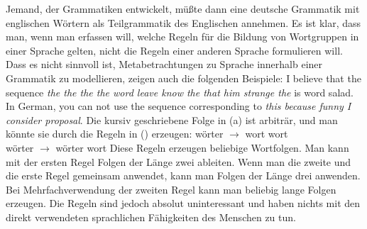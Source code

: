 Jemand, der Grammatiken entwickelt, müßte dann eine deutsche Grammatik mit englischen Wörtern
als Teilgrammatik des Englischen annehmen. Es ist klar, dass man, wenn man erfassen will, welche
Regeln für die Bildung von Wortgruppen in einer Sprache gelten, nicht die Regeln einer anderen
Sprache formulieren will. Dass es nicht sinnvoll ist, Metabetrachtungen zu Sprache innerhalb
einer Grammatik zu modellieren, zeigen auch die folgenden Beispiele:
\eal
\ex I believe that the sequence \emph{the the the the word leave know the that him strange the} is word salad.
\ex In German, you can not use the sequence corresponding to \emph{this because funny I consider proposal}.
\zl
Die kursiv geschriebene Folge in (a) ist arbiträr, und man könnte sie durch die Regeln in () erzeugen:
\ea
wörter $\to$ wort wort\\
wörter $\to$ wörter wort
\z
Diese Regeln erzeugen beliebige Wortfolgen. Man kann mit der ersten Regel Folgen der Länge zwei
ableiten. Wenn man die zweite und die erste Regel gemeinsam anwendet, kann man Folgen der Länge drei
anwenden. Bei Mehrfachverwendung der zweiten Regel kann man beliebig lange Folgen erzeugen.
Die Regeln sind jedoch absolut uninteressant und 
haben nichts mit den direkt verwendeten sprachlichen Fähigkeiten des Menschen zu tun.

